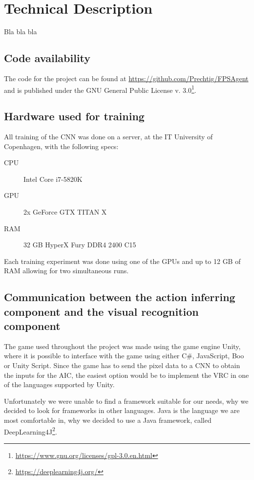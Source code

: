 
\section{Technical Description}
Bla bla bla

\subsection{Code availability}
The code for the project can be found at \url{https://github.com/Prechtig/FPSAgent} and is published under the GNU General Public License v. 3.0\footnote{\url{https://www.gnu.org/licenses/gpl-3.0.en.html}}.

\subsection{Hardware used for training}
\label{sub:hardware}
All training of the CNN was done on a server, at the IT University of Copenhagen, with the following specs:

\begin{description}
	\item [CPU] Intel\textsuperscript{\textregistered} Core\textsuperscript{\texttrademark} i7-5820K
	\item [GPU] 2x GeForce\textsuperscript{\textregistered} GTX TITAN X
	\item [RAM] 32 GB HyperX Fury DDR4 2400 C15
\end{description}	

\noindent
Each training experiment was done using one of the GPUs and up to 12 GB of RAM allowing for two simultaneous runs.

\subsection{Communication between the action inferring component and the visual recognition component}
\label{sec:com-vrc-aic}
The game used throughout the project was made using the game engine Unity, where it is possible to interface with the game using either C\#, JavaScript, Boo or Unity Script. Since the game has to send the pixel data to a CNN to obtain the inputs for the AIC, the easiest option would be to implement the VRC in one of the languages supported by Unity.

Unfortunately we were unable to find a framework suitable for our needs, why we decided to look for frameworks in other languages. Java is the language we are most comfortable in, why we decided to use a Java framework, called DeepLearning4J\footnote{\url{https://deeplearning4j.org/}}.

